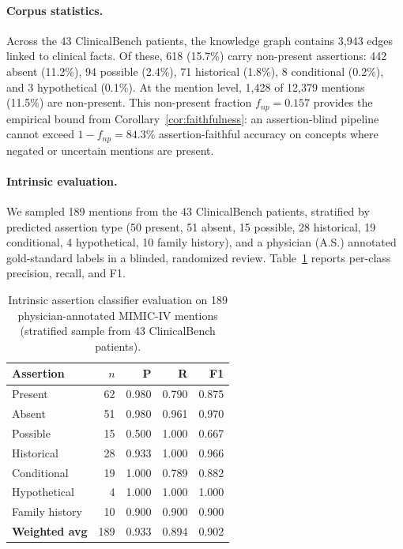 \paragraph{Corpus statistics.}
Across the 43 ClinicalBench patients, the knowledge graph contains 3{,}943 edges linked to clinical facts.
Of these, 618 (15.7\%) carry non-present assertions: 442 absent (11.2\%), 94 possible (2.4\%), 71 historical (1.8\%), 8 conditional (0.2\%), and 3 hypothetical (0.1\%).
At the mention level, 1{,}428 of 12{,}379 mentions (11.5\%) are non-present.
This non-present fraction $f_{\textit{np}} = 0.157$ provides the empirical bound from Corollary~\ref{cor:faithfulness}: an assertion-blind pipeline cannot exceed $1 - f_{\textit{np}} = 84.3\%$ assertion-faithful accuracy on concepts where negated or uncertain mentions are present.

\paragraph{Intrinsic evaluation.}
We sampled 189 mentions from the 43 ClinicalBench patients, stratified by predicted assertion type (50 present, 51 absent, 15 possible, 28 historical, 19 conditional, 4 hypothetical, 10 family history), and a physician (A.S.) annotated gold-standard labels in a blinded, randomized review.
Table~\ref{tab:assertion_intrinsic} reports per-class precision, recall, and F1.

\begin{table}[ht]
\centering
\small
\caption{Intrinsic assertion classifier evaluation on 189 physician-annotated
  MIMIC-IV mentions (stratified sample from 43 ClinicalBench patients).}
\label{tab:assertion_intrinsic}
\begin{tabular}{@{}lrrrr@{}}
\toprule
Assertion & $n$ & P & R & F1 \\
\midrule
Present & 62 & 0.980 & 0.790 & 0.875 \\
Absent & 51 & 0.980 & 0.961 & 0.970 \\
Possible & 15 & 0.500 & 1.000 & 0.667 \\
Historical & 28 & 0.933 & 1.000 & 0.966 \\
Conditional & 19 & 1.000 & 0.789 & 0.882 \\
Hypothetical & 4 & 1.000 & 1.000 & 1.000 \\
Family history & 10 & 0.900 & 0.900 & 0.900 \\
\midrule
\textbf{Weighted avg} & 189 & 0.933 & 0.894 & 0.902 \\
\bottomrule
\end{tabular}
\end{table}

